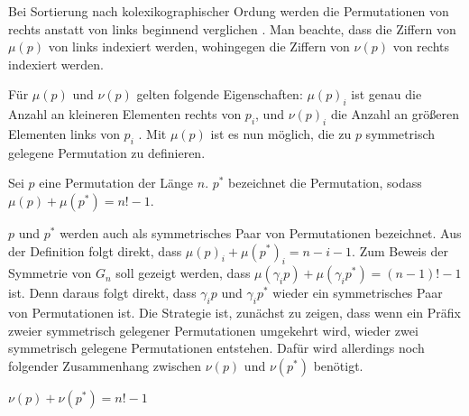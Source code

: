 \documentclass[a4paper, 10pt, ngerman]{article}
\begin{document}
Bei Sortierung nach kolexikographischer Ordung werden die Permutationen von rechts anstatt von links beginnend verglichen \cite{lexicographic}. Man beachte, dass die Ziffern von $\mu(p)$ von links indexiert werden, wohingegen die Ziffern von $\nu(p)$ von rechts indexiert werden.

Für $\mu(p)$ und $\nu(p)$ gelten folgende Eigenschaften: $\mu(p)_i$ ist genau die Anzahl an kleineren Elementen rechts von $p_i$, und $\nu(p)_i$ die Anzahl an größeren Elementen links von $p_i$ \cite{factorial}. Mit $\mu(p)$ ist es nun möglich, die zu $p$ symmetrisch gelegene Permutation zu definieren.

\begin{definition}
    Sei $p$ eine Permutation der Länge $n$. $p^*$ bezeichnet die Permutation, sodass $\mu(p) + \mu(p^*) = n! - 1$.
\end{definition}

$p$ und $p^*$ werden auch als symmetrisches Paar von Permutationen bezeichnet. Aus der Definition folgt direkt, dass $\mu(p)_i + \mu(p^*)_i = n - i - 1$. Zum Beweis der Symmetrie von $G_n$ soll gezeigt werden, dass $\mu(\gamma_i p) + \mu(\gamma_i p^*) = (n - 1)! - 1$ ist. Denn daraus folgt direkt, dass $\gamma_i p$ und $\gamma_i p^*$ wieder ein symmetrisches Paar von Permutationen ist. Die Strategie ist, zunächst zu zeigen, dass wenn ein Präfix zweier symmetrisch gelegener Permutationen umgekehrt wird, wieder zwei symmetrisch gelegene Permutationen entstehen. Dafür wird allerdings noch folgender Zusammenhang zwischen $\nu(p)$ und $\nu(p^*)$ benötigt.

\begin{lemma}
    $\nu(p) + \nu(p^*) = n! - 1$ 
\end{lemma}
\end{document}
